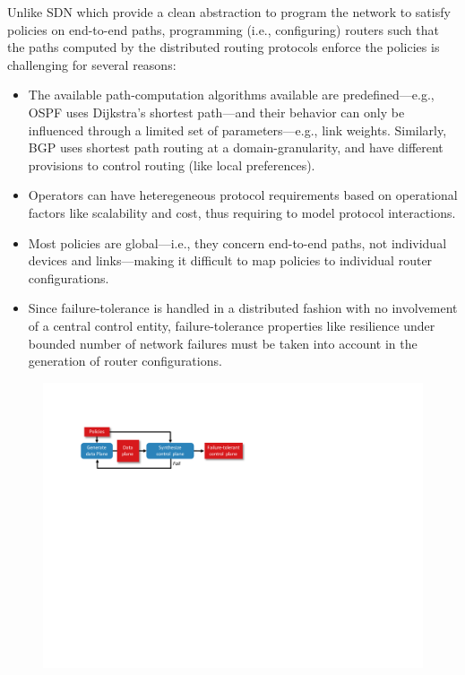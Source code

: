 Unlike SDN which provide a clean abstraction
to program the network to satisfy policies 
on end-to-end paths,
programming (i.e., configuring) 
routers such that the paths computed by
the distributed routing protocols enforce the 
policies is challenging for several reasons: 
\begin{itemize}
\item The available path-computation algorithms
available are predefined---e.g., OSPF uses
Dijkstra's shortest path---and their behavior can only be influenced
through a limited set of parameters---e.g.,
link weights. Similarly, BGP uses shortest
path routing at a domain-granularity, and have different
provisions to control routing (like local preferences).  
\item Operators can have 
heteregeneous protocol requirements based on operational
factors like scalability and cost, thus requiring to model
protocol interactions. 
\item Most policies are
global---i.e., they concern end-to-end paths, not individual devices and
links---making it difficult to map policies to
individual router configurations. 
\item Since failure-tolerance is handled in a distributed 
fashion with no involvement of a central control entity,  
failure-tolerance properties like resilience under bounded
number of network failures must be taken into account in
the generation of router configurations. 

\end{itemize}

\begin{figure}
\centering
\includegraphics[width=\columnwidth]{figures/architecture.pdf}
\label{fig:architecture}
\end{figure}

